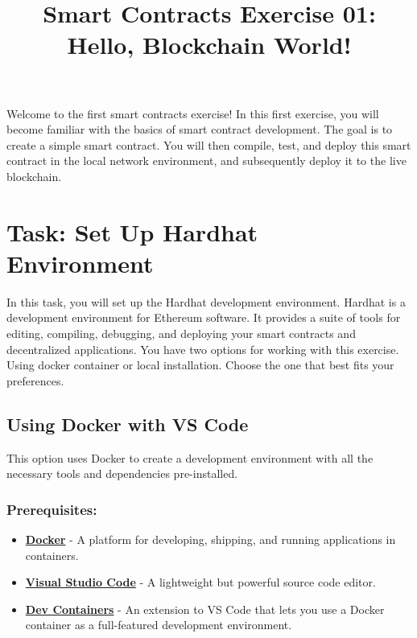 \documentclass[12pt]{article}
\title{Smart Contracts Exercise 01: \\ Hello, Blockchain World!}
\author{}
\date{}
\begin{document}
\maketitle
Welcome to the first smart contracts exercise! In this first exercise, you will become familiar with the basics of smart contract development. The goal is to create a simple smart contract. You will then compile, test, and deploy this smart contract in the local network environment, and subsequently deploy it to the live blockchain.

\section{Task: Set Up Hardhat Environment}

In this task, you will set up the Hardhat development environment. Hardhat is a development environment for Ethereum software. It provides a suite of tools for editing, compiling, debugging, and deploying your smart contracts and decentralized applications. You have two options for working with this exercise. Using docker container or local installation. Choose the one that best fits your preferences.

\subsection{Using Docker with VS Code}

This option uses Docker to create a development environment with all the necessary tools and dependencies pre-installed.

\subsubsection*{Prerequisites:}

\begin{itemize}
    \item \textbf{\href{https://www.docker.com/products/docker-desktop}{Docker}} - A platform for developing, shipping, and running applications in containers.
    \item \textbf{\href{https://code.visualstudio.com/}{Visual Studio Code}} - A lightweight but powerful source code editor.
    \item \textbf{\href{https://marketplace.visualstudio.com/items?itemName=ms-vscode-remote.remote-containers}{Dev Containers}} - An extension to VS Code that lets you use a Docker container as a full-featured development environment.
\end{itemize}
\end{document}
